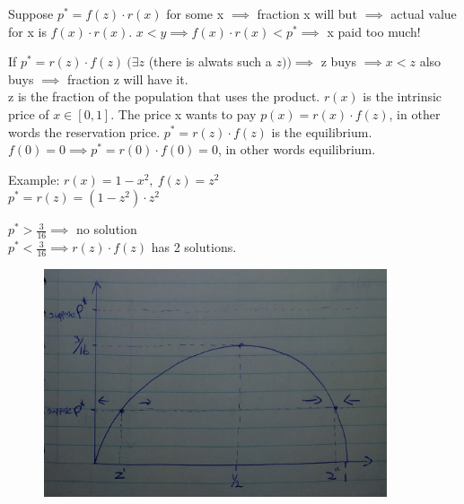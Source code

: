 \documentclass[12pt]{scrartcl}
\begin{document}
\noindent Suppose $p^{*} = f(z)\cdot r(x)$ for some x $\implies$ fraction x will but $\implies$ actual value for x is $f(x)\cdot r(x)$. $x < y \implies f(x)\cdot r(x) < p^{*} \implies$ x paid too much!

\noindent If $p^{*} = r(z)\cdot f(z)\ (\exists z$ (there is alwats such a $z)) \implies$ z buys $\implies x< z$ also buys $\implies$ fraction z will have it.\\

\noindent z is the fraction of the population that uses the product. $r(x)$ is the intrinsic price of $x \in [0,1]$. The price x wants to pay $p(x) = r(x)\cdot f(z) $, in other words the reservation price. $p^{*} = r(z)\cdot f(z)$ is the equilibrium.
$f(0) = 0 \implies p^{*} = r(0)\cdot f(0) = 0$, in other words equilibrium.




\noindent Example: $r(x) = 1 - x^{2},\ f(z) = z^{2}$\\
$p^{*} = r(z) = (1-z^{2})\cdot z^{2}$

\noindent $p^{*} > \frac{3}{16} \implies$ no solution\\
$p^{*} < \frac{3}{16} \implies r(z)\cdot f(z)$ has 2 solutions.

\begin{figure}[h]
	\centering
	\includegraphics[width=0.9\textwidth]{./images/graph_tipping_point.png}
\end{figure}
\end{document}
